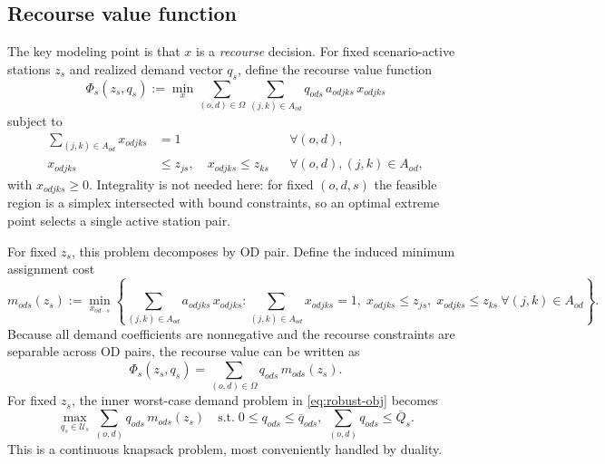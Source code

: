 \documentclass[11pt]{article}
\newcommand{\cU}{\mathcal{U}}
\theoremstyle{definition}
\begin{document}
\subsection{Recourse value function}

The key modeling point is that $x$ is a \emph{recourse} decision.  For fixed
scenario-active stations $z_s$ and realized demand vector $q_s$, define the
recourse value function
\begin{equation}
	\Phi_s(z_s,q_s)
	:=
	\min_{x}
	\sum_{(o,d)\in\Omega}\sum_{(j,k)\in A_{od}}
	q_{ods}\,a_{odjks}\,x_{odjks}
	\label{eq:recourse-value}
\end{equation}
subject to
\begin{align}
	\sum_{(j,k)\in A_{od}} x_{odjks} & = 1                                   &                                                           & \forall (o,d), \label{eq:recourse-assign} \\
	x_{odjks}                        & \le z_{js},\quad x_{odjks} \le z_{ks}
	                                 &                                       & \forall (o,d),(j,k)\in A_{od}, \label{eq:recourse-active}
\end{align}
with $x_{odjks} \ge 0$.  Integrality is not needed here: for fixed $(o,d,s)$
the feasible region is a simplex intersected with bound constraints, so an
optimal extreme point selects a single active station pair.

For fixed $z_s$, this problem decomposes by OD pair.  Define the induced
minimum assignment cost
\begin{equation}
	m_{ods}(z_s)
	:=
	\min_{x_{od\cdot\cdot s}}
	\left\{
	\sum_{(j,k)\in A_{od}} a_{odjks}\,x_{odjks}
	:
	\sum_{(j,k)\in A_{od}} x_{odjks}=1,\;
	x_{odjks}\le z_{js},\;
	x_{odjks}\le z_{ks}
	\ \forall (j,k)\in A_{od}
	\right\}.
	\label{eq:induced-cost}
\end{equation}
Because all demand coefficients are nonnegative and the recourse constraints are
separable across OD pairs, the recourse value can be written as
\begin{equation}
	\Phi_s(z_s,q_s)
	=
	\sum_{(o,d)\in\Omega} q_{ods}\,m_{ods}(z_s).
	\label{eq:recourse-separable}
\end{equation}
For fixed $z_s$, the inner worst-case demand problem in \eqref{eq:robust-obj}
becomes
\begin{equation}
	\max_{q_s \in \cU_s}
	\sum_{(o,d)} q_{ods}\,m_{ods}(z_s)
	\quad
	\text{s.t.}\;
	0 \le q_{ods} \le \overline{q}_{ods},\;
	\sum_{(o,d)} q_{ods} \le \overline{Q}_s.
	\label{eq:inner-max}
\end{equation}
This is a continuous knapsack problem, most conveniently handled by duality.
\end{document}
